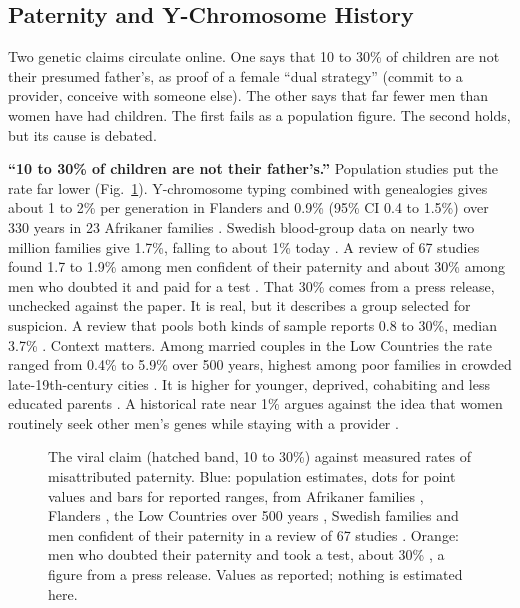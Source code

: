 \documentclass[conference,a4paper]{IEEEtran}
\begin{document}
\subsection{Paternity and Y-Chromosome History}
\label{sec:paternity}
Two genetic claims circulate online. One says that 10 to 30\% of children are not their presumed father's, as proof of a female ``dual strategy'' (commit to a provider, conceive with someone else). The other says that far fewer men than women have had children. The first fails as a population figure. The second holds, but its cause is debated.

\textbf{``10 to 30\% of children are not their father's.''} Population studies put the rate far lower (Fig.~\ref{fig:paternity}). Y-chromosome typing combined with genealogies gives about 1 to 2\% per generation in Flanders \cite{larmuseau2013} and 0.9\% (95\% CI 0.4 to 1.5\%) over 330 years in 23 Afrikaner families \cite{greeff2015}. Swedish blood-group data on nearly two million families give 1.7\%, falling to about 1\% today \cite{dahlen2022}. A review of 67 studies found 1.7 to 1.9\% among men confident of their paternity and about 30\% among men who doubted it and paid for a test \cite{anderson2006}. That 30\% comes from a press release, unchecked against the paper. It is real, but it describes a group selected for suspicion. A review that pools both kinds of sample reports 0.8 to 30\%, median 3.7\% \cite{bellis2005}. Context matters. Among married couples in the Low Countries the rate ranged from 0.4\% to 5.9\% over 500 years, highest among poor families in crowded late-19th-century cities \cite{larmuseau2019}. It is higher for younger, deprived, cohabiting \cite{bellis2005} and less educated parents \cite{dahlen2022}. A historical rate near 1\% argues against the idea that women routinely seek other men's genes while staying with a provider \cite{larmuseau2016}.

\begin{figure}[t]
\centering

\caption{The viral claim (hatched band, 10 to 30\%) against measured rates of misattributed paternity. Blue: population estimates, dots for point values and bars for reported ranges, from Afrikaner families \cite{greeff2015}, Flanders \cite{larmuseau2013}, the Low Countries over 500 years \cite{larmuseau2019}, Swedish families \cite{dahlen2022} and men confident of their paternity in a review of 67 studies \cite{anderson2006}. Orange: men who doubted their paternity and took a test, about 30\% \cite{anderson2006}, a figure from a press release. Values as reported; nothing is estimated here.}
\label{fig:paternity}
\end{figure}
\end{document}
